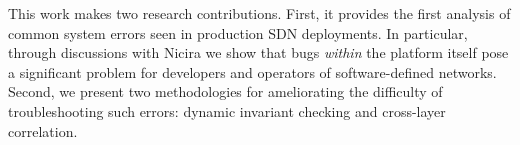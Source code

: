 
%
%
%
%
%

This work makes two research contributions. First, it provides the first
analysis of common system errors seen in production SDN deployments. In
particular, through discussions with Nicira we show that bugs {\it within} the platform
itself pose a significant problem for developers and operators of software-defined
networks. Second, we present two methodologies for ameliorating the difficulty of
troubleshooting such errors: dynamic invariant checking and cross-layer
correlation.
